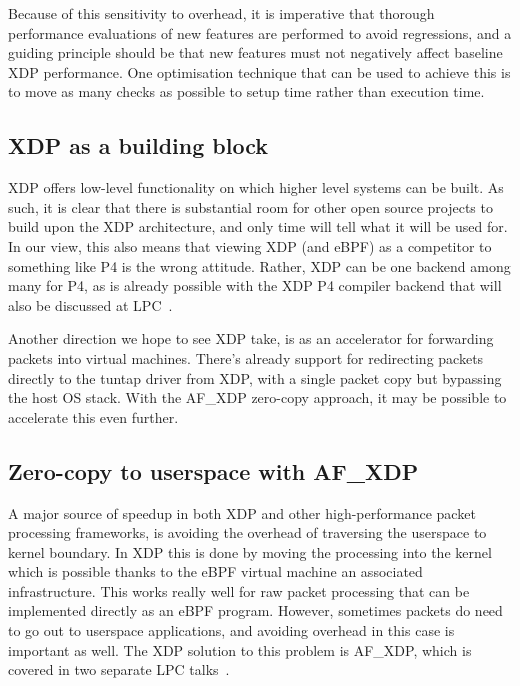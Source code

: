 \documentclass[sigconf]{acmart}
\begin{document}
Because of this sensitivity to overhead, it is imperative that thorough
performance evaluations of new features are performed to avoid regressions, and
a guiding principle should be that new features must not negatively affect
baseline XDP performance. One optimisation technique that can be used to achieve
this is to move as many checks as possible to setup time rather than execution
time.

\subsection{XDP as a building block}
\label{sec:xdp-as-building}

XDP offers low-level functionality on which higher level systems can be built.
As such, it is clear that there is substantial room for other open source
projects to build upon the XDP architecture, and only time will tell what it
will be used for. In our view, this also means that viewing XDP (and eBPF) as a
competitor to something like P4 is the wrong attitude. Rather, XDP can be one
backend among many for P4, as is already possible with the XDP P4 compiler
backend that will also be discussed at LPC~\cite{xdp-p4}.

Another direction we hope to see XDP take, is as an accelerator for forwarding
packets into virtual machines. There's already support for redirecting packets
directly to the tuntap driver from XDP, with a single packet copy but bypassing
the host OS stack. With the AF\_XDP zero-copy approach, it may be possible to
accelerate this even further.

\subsection{Zero-copy to userspace with AF\_XDP}
\label{sec:zero-copy-userspace}

A major source of speedup in both XDP and other high-performance packet
processing frameworks, is avoiding the overhead of traversing the userspace to
kernel boundary. In XDP this is done by moving the processing into the kernel
which is possible thanks to the eBPF virtual machine an associated
infrastructure. This works really well for raw packet processing that can be
implemented directly as an eBPF program. However, sometimes packets do need to
go out to userspace applications, and avoiding overhead in this case is
important as well. The XDP solution to this problem is AF\_XDP, which is covered
in two separate LPC talks~\cite{af-xdp,xdp-ovs}.
\end{document}
